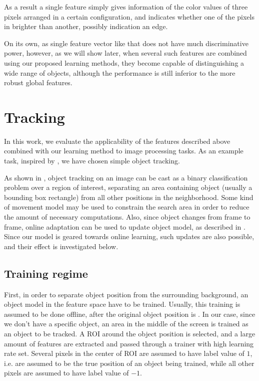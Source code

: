As a result a single feature simply gives information of the color values of three pixels arranged in a certain configuration, and indicates whether one of the pixels in brighter than another, possibly indication an edge.

On its own, as single feature vector like that does not have much discriminative power, however, as we will show later, when several such features are combined using our proposed learning methods, they become capable of distinguishing a wide range of objects, although the performance is still inferior to the more robust global features. 
\section{Tracking}
In this work, we evaluate the applicability of the features described above combined with our learning method to image processing tasks. As an example task, inspired by \cite{OnlineBoost}, we have chosen simple object tracking. 

As shown in \cite{avidan}, object tracking on an image can be cast as a binary classification problem over a region of interest, separating an area containing object (usually a bounding box rectangle) from all other positions in the neighborhood. Some kind of movement model may be used to constrain the search area in order to reduce the amount of necessary computations. Also, since object changes from frame to frame, online adaptation can be used to update object model, as described in \cite{OnlineBoost}. Since our model is geared towards online learning, such updates are also possible, and their effect is investigated below.
\subsection{Training regime}
First, in order to separate object position from the surrounding background, an object model in the feature space have to be trained. Usually, this training is assumed to be done offline, after the original object position is . In our case, since we don't have a specific object, an area in the middle of the screen is trained as an object to be tracked. A ROI around the object position is selected, and a large amount of features are extracted and passed through a trainer with high learning rate set. Several pixels in the center of ROI are assumed to have label value of $1$, i.e. are assumed to be the true position of an object being trained, while all other pixels are assumed to have label value of $-1$. 

